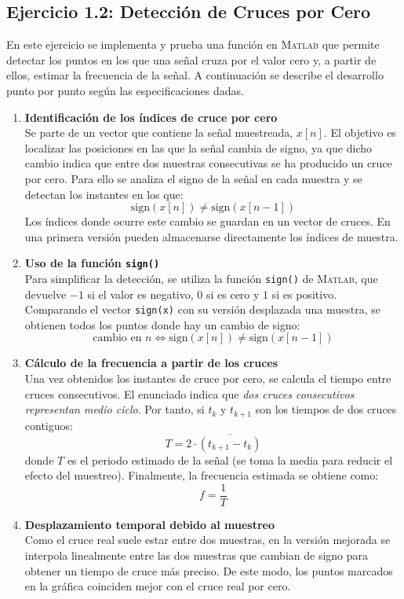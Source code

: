 \documentclass{article}
\begin{document}
\subsection*{Ejercicio 1.2: Detección de Cruces por Cero}

En este ejercicio se implementa y prueba una función en \textsc{Matlab} que permite detectar los puntos en los que una señal cruza por el valor cero y, a partir de ellos, estimar la frecuencia de la señal. A continuación se describe el desarrollo punto por punto según las especificaciones dadas.

\begin{enumerate}
    \item \textbf{Identificación de los índices de cruce por cero}\\
    Se parte de un vector que contiene la señal muestreada, $x[n]$. El objetivo es localizar las posiciones en las que la señal cambia de signo, ya que dicho cambio indica que entre dos muestras consecutivas se ha producido un cruce por cero. Para ello se analiza el signo de la señal en cada muestra y se detectan los instantes en los que:
    \[
        \text{sign}(x[n]) \neq \text{sign}(x[n-1])
    \]
    Los índices donde ocurre este cambio se guardan en un vector de cruces. En una primera versión pueden almacenarse directamente los índices de muestra.

    \item \textbf{Uso de la función \texttt{sign()}}\\
    Para simplificar la detección, se utiliza la función \texttt{sign()} de \textsc{Matlab}, que devuelve $-1$ si el valor es negativo, $0$ si es cero y $1$ si es positivo. Comparando el vector \texttt{sign(x)} con su versión desplazada una muestra, se obtienen todos los puntos donde hay un cambio de signo:
    \[
        \text{cambio en } n \iff \text{sign}(x[n]) \neq \text{sign}(x[n-1])
    \]

    \item \textbf{Cálculo de la frecuencia a partir de los cruces}\\
    Una vez obtenidos los instantes de cruce por cero, se calcula el tiempo entre cruces consecutivos. El enunciado indica que \emph{dos cruces consecutivos representan medio ciclo}. Por tanto, si $t_k$ y $t_{k+1}$ son los tiempos de dos cruces contiguos:
    \[
        T = 2 \cdot \overline{(t_{k+1} - t_k)}
    \]
    donde $T$ es el periodo estimado de la señal (se toma la media para reducir el efecto del muestreo). Finalmente, la frecuencia estimada se obtiene como:
    \[
        f = \frac{1}{T}
    \]

    \item \textbf{Desplazamiento temporal debido al muestreo}\\
    Como el cruce real suele estar entre dos muestras, en la versión mejorada se interpola linealmente entre las dos muestras que cambian de signo para obtener un tiempo de cruce más preciso. De este modo, los puntos marcados en la gráfica coinciden mejor con el cruce real por cero.
\end{enumerate}
\end{document}
